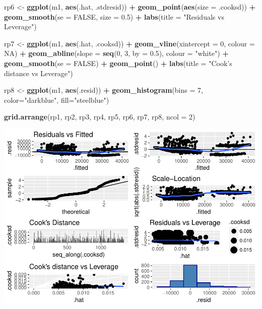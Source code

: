\documentclass[]{article}
\newenvironment{Shaded}{\begin{snugshade}}{\end{snugshade}}
\newcommand{\KeywordTok}[1]{\textcolor[rgb]{0.13,0.29,0.53}{\textbf{#1}}}
\newcommand{\DataTypeTok}[1]{\textcolor[rgb]{0.13,0.29,0.53}{#1}}
\newcommand{\DecValTok}[1]{\textcolor[rgb]{0.00,0.00,0.81}{#1}}
\newcommand{\FloatTok}[1]{\textcolor[rgb]{0.00,0.00,0.81}{#1}}
\newcommand{\StringTok}[1]{\textcolor[rgb]{0.31,0.60,0.02}{#1}}
\newcommand{\OtherTok}[1]{\textcolor[rgb]{0.56,0.35,0.01}{#1}}
\newcommand{\OperatorTok}[1]{\textcolor[rgb]{0.81,0.36,0.00}{\textbf{#1}}}
\newcommand{\NormalTok}[1]{#1}
\begin{document}
\begin{Shaded}
\begin{Highlighting}[]
\NormalTok{rp6 <-}\StringTok{ }\KeywordTok{ggplot}\NormalTok{(m1, }\KeywordTok{aes}\NormalTok{(.hat, .stdresid)) }\OperatorTok{+}
\StringTok{  }\KeywordTok{geom_point}\NormalTok{(}\KeywordTok{aes}\NormalTok{(}\DataTypeTok{size =}\NormalTok{ .cooksd)) }\OperatorTok{+}
\StringTok{  }\KeywordTok{geom_smooth}\NormalTok{(}\DataTypeTok{se =} \OtherTok{FALSE}\NormalTok{, }\DataTypeTok{size =} \FloatTok{0.5}\NormalTok{) }\OperatorTok{+}
\StringTok{  }\KeywordTok{labs}\NormalTok{(}\DataTypeTok{title =} \StringTok{"Residuals vs Leverage"}\NormalTok{)}

\NormalTok{rp7 <-}\StringTok{ }\KeywordTok{ggplot}\NormalTok{(m1, }\KeywordTok{aes}\NormalTok{(.hat, .cooksd)) }\OperatorTok{+}
\StringTok{  }\KeywordTok{geom_vline}\NormalTok{(}\DataTypeTok{xintercept =} \DecValTok{0}\NormalTok{, }\DataTypeTok{colour =} \OtherTok{NA}\NormalTok{) }\OperatorTok{+}
\StringTok{  }\KeywordTok{geom_abline}\NormalTok{(}\DataTypeTok{slope =} \KeywordTok{seq}\NormalTok{(}\DecValTok{0}\NormalTok{, }\DecValTok{3}\NormalTok{, }\DataTypeTok{by =} \FloatTok{0.5}\NormalTok{), }\DataTypeTok{colour =} \StringTok{"white"}\NormalTok{) }\OperatorTok{+}
\StringTok{  }\KeywordTok{geom_smooth}\NormalTok{(}\DataTypeTok{se =} \OtherTok{FALSE}\NormalTok{) }\OperatorTok{+}
\StringTok{  }\KeywordTok{geom_point}\NormalTok{() }\OperatorTok{+}
\StringTok{  }\KeywordTok{labs}\NormalTok{(}\DataTypeTok{title =} \StringTok{"Cook's distance vs Leverage"}\NormalTok{)}

\NormalTok{rp8 <-}\StringTok{ }\KeywordTok{ggplot}\NormalTok{(m1, }\KeywordTok{aes}\NormalTok{(.resid)) }\OperatorTok{+}
\StringTok{  }\KeywordTok{geom_histogram}\NormalTok{(}\DataTypeTok{bins =} \DecValTok{7}\NormalTok{, }\DataTypeTok{color=}\StringTok{"darkblue"}\NormalTok{, }\DataTypeTok{fill=}\StringTok{"steelblue"}\NormalTok{)}

\KeywordTok{grid.arrange}\NormalTok{(rp1, rp2, rp3, rp4, rp5, rp6, rp7, rp8, }\DataTypeTok{ncol =} \DecValTok{2}\NormalTok{)}
\end{Highlighting}
\end{Shaded}

\includegraphics{DATA_605_Discussion_12_files/figure-latex/model-one-lots-1.pdf}
\end{document}
